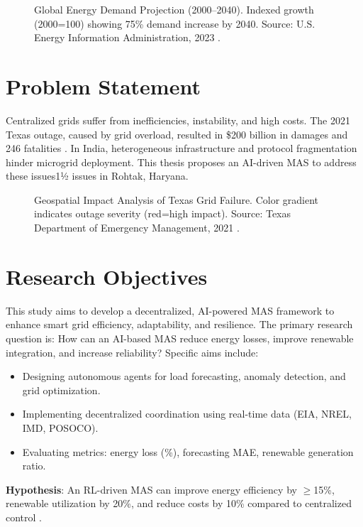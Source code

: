 \documentclass[12pt]{report}
\begin{document}
\begin{figure}[h]
  \centering
  \caption{Global Energy Demand Projection (2000--2040). Indexed growth (2000=100) showing 75\% demand increase by 2040. Source: U.S. Energy Information Administration, 2023 \cite{eia2023}.}
  \label{fig:energy_demand}
\end{figure}

\section{Problem Statement}
Centralized grids suffer from inefficiencies, instability, and high costs. The 2021 Texas outage, caused by grid overload, resulted in \$200 billion in damages and 246 fatalities \cite{ercot2021}. In India, heterogeneous infrastructure and protocol fragmentation hinder microgrid deployment. This thesis proposes an AI-driven MAS to address these issues1½ issues in Rohtak, Haryana.

\begin{figure}[h]
  \centering
  \caption{Geospatial Impact Analysis of Texas Grid Failure. Color gradient indicates outage severity (red=high impact). Source: Texas Department of Emergency Management, 2021 \cite{ercot2021}.}
  \label{fig:texas_outage}
\end{figure}

\section{Research Objectives}
This study aims to develop a decentralized, AI-powered MAS framework to enhance smart grid efficiency, adaptability, and resilience. The primary research question is: How can an AI-based MAS reduce energy losses, improve renewable integration, and increase reliability? Specific aims include:
\begin{itemize}
  \item Designing autonomous agents for load forecasting, anomaly detection, and grid optimization.
  \item Implementing decentralized coordination using real-time data (EIA, NREL, IMD, POSOCO).
  \item Evaluating metrics: energy loss (\%), forecasting MAE, renewable generation ratio.
\end{itemize}
\textbf{Hypothesis}: An RL-driven MAS can improve energy efficiency by $\geq$15\%, renewable utilization by 20\%, and reduce costs by 10\% compared to centralized control \cite{author2025}.
\end{document}
